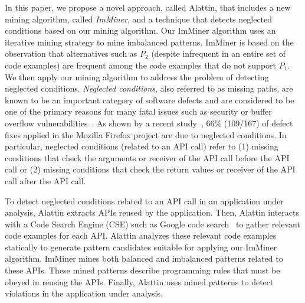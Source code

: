 In this paper, we propose a novel approach, called Alattin, that includes a new mining algorithm, called \emph{ImMiner}, and a technique that detects neglected conditions based on our mining algorithm. Our ImMiner algorithm uses an iterative mining strategy to mine imbalanced patterns. ImMiner is based on the observation that alternatives such as $P_2$ (despite infrequent in an entire set of code examples) are frequent among the code examples that do not support $P_1$. We then apply our mining algorithm to address the problem of detecting neglected conditions. \emph{Neglected conditions}, also referred to as missing paths, are known to be an important category of software defects and are considered to be one of the primary reasons for many fatal issues such as security or buffer overflow vulnerabilities~\cite{chang07:finding}. As shown by a recent study~\cite{chang07:finding}, 66\% (109/167) of defect fixes applied in the Mozilla Firefox project are due to neglected conditions. In particular, neglected conditions (related to an API call) refer to 
(1) missing conditions that check the arguments or receiver of the API call before the API call or 
(2) missing conditions that check the return values or receiver of the API call after the API call.

To detect neglected conditions related to an API call in an application under analysis, Alattin extracts APIs reused by the application. Then, Alattin interacts with a Code Search Engine (CSE) such as Google code search~\cite{GCSE} to gather relevant code examples for each API. Alattin analyzes these relevant code examples statically to generate pattern candidates suitable for applying our ImMiner algorithm. ImMiner mines both balanced and imbalanced patterns related to these APIs. These mined patterns describe programming rules that must be obeyed in reusing the APIs. Finally, Alattin uses mined patterns to detect violations in the application under analysis.

